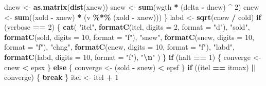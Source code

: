 \documentclass[
  12pt,
]{article}
\newenvironment{Shaded}{\begin{snugshade}}{\end{snugshade}}
\newcommand{\AttributeTok}[1]{\textcolor[rgb]{0.13,0.29,0.53}{#1}}
\newcommand{\ControlFlowTok}[1]{\textcolor[rgb]{0.13,0.29,0.53}{\textbf{#1}}}
\newcommand{\DecValTok}[1]{\textcolor[rgb]{0.00,0.00,0.81}{#1}}
\newcommand{\FunctionTok}[1]{\textcolor[rgb]{0.13,0.29,0.53}{\textbf{#1}}}
\newcommand{\NormalTok}[1]{#1}
\newcommand{\OtherTok}[1]{\textcolor[rgb]{0.56,0.35,0.01}{#1}}
\newcommand{\SpecialCharTok}[1]{\textcolor[rgb]{0.81,0.36,0.00}{\textbf{#1}}}
\newcommand{\StringTok}[1]{\textcolor[rgb]{0.31,0.60,0.02}{#1}}
\begin{document}
\begin{Shaded}
\begin{Highlighting}[]
\NormalTok{      dnew }\OtherTok{\textless{}{-}} \FunctionTok{as.matrix}\NormalTok{(}\FunctionTok{dist}\NormalTok{(xnew))}
\NormalTok{      snew }\OtherTok{\textless{}{-}} \FunctionTok{sum}\NormalTok{(wgth }\SpecialCharTok{*}\NormalTok{ (delta }\SpecialCharTok{{-}}\NormalTok{ dnew) }\SpecialCharTok{\^{}} \DecValTok{2}\NormalTok{)}
\NormalTok{      cnew }\OtherTok{\textless{}{-}} \FunctionTok{sum}\NormalTok{((xold }\SpecialCharTok{{-}}\NormalTok{ xnew) }\SpecialCharTok{*}\NormalTok{ (v }\SpecialCharTok{\%*\%}\NormalTok{ (xold }\SpecialCharTok{{-}}\NormalTok{ xnew)))}
\NormalTok{    \}}
\NormalTok{    labd }\OtherTok{\textless{}{-}} \FunctionTok{sqrt}\NormalTok{(cnew }\SpecialCharTok{/}\NormalTok{ cold)}
    \ControlFlowTok{if}\NormalTok{ (verbose }\SpecialCharTok{==} \DecValTok{2}\NormalTok{) \{}
      \FunctionTok{cat}\NormalTok{(}
        \StringTok{"itel"}\NormalTok{,}
        \FunctionTok{formatC}\NormalTok{(itel, }\AttributeTok{digits =} \DecValTok{2}\NormalTok{, }\AttributeTok{format =} \StringTok{"d"}\NormalTok{),}
        \StringTok{"sold"}\NormalTok{,}
        \FunctionTok{formatC}\NormalTok{(sold, }\AttributeTok{digits =} \DecValTok{10}\NormalTok{, }\AttributeTok{format =} \StringTok{"f"}\NormalTok{),}
        \StringTok{"snew"}\NormalTok{,}
        \FunctionTok{formatC}\NormalTok{(snew, }\AttributeTok{digits =} \DecValTok{10}\NormalTok{, }\AttributeTok{format =} \StringTok{"f"}\NormalTok{),}
        \StringTok{"chng"}\NormalTok{,}
        \FunctionTok{formatC}\NormalTok{(cnew, }\AttributeTok{digits =}  \DecValTok{10}\NormalTok{, }\AttributeTok{format =} \StringTok{"f"}\NormalTok{),}
        \StringTok{"labd"}\NormalTok{,}
        \FunctionTok{formatC}\NormalTok{(labd, }\AttributeTok{digits =}  \DecValTok{10}\NormalTok{, }\AttributeTok{format =} \StringTok{"f"}\NormalTok{),}
        \StringTok{"}\SpecialCharTok{\textbackslash{}n}\StringTok{"}
\NormalTok{      )}
\NormalTok{    \}}
    \ControlFlowTok{if}\NormalTok{ (halt }\SpecialCharTok{==} \DecValTok{1}\NormalTok{) \{}
\NormalTok{      converge }\OtherTok{\textless{}{-}}\NormalTok{ cnew }\SpecialCharTok{\textless{}}\NormalTok{ epsx}
\NormalTok{    \} }\ControlFlowTok{else}\NormalTok{ \{}
\NormalTok{      converge }\OtherTok{\textless{}{-}}\NormalTok{ (sold }\SpecialCharTok{{-}}\NormalTok{ snew) }\SpecialCharTok{\textless{}}\NormalTok{ epsf}
\NormalTok{    \}}
    \ControlFlowTok{if}\NormalTok{ ((itel }\SpecialCharTok{==}\NormalTok{ itmax) }\SpecialCharTok{||}\NormalTok{ converge) \{}
      \ControlFlowTok{break}
\NormalTok{    \}}
\NormalTok{    itel }\OtherTok{\textless{}{-}}\NormalTok{ itel }\SpecialCharTok{+} \DecValTok{1}

\end{Highlighting}
\end{Shaded}
\end{document}

